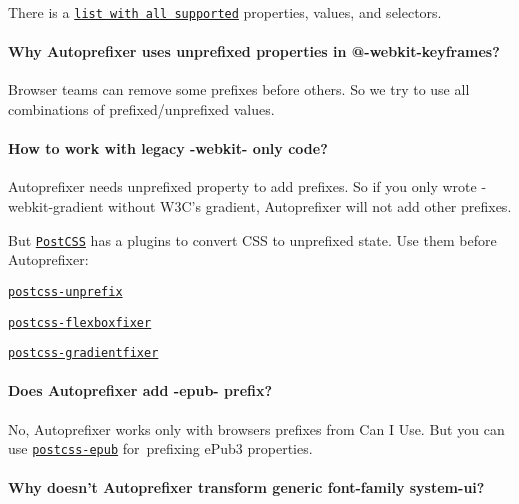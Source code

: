 There is a \href{https://github.com/postcss/autoprefixer/wiki/support-list}{\tt list with all supported} properties, values, and selectors.

\paragraph*{Why Autoprefixer uses unprefixed properties in {\ttfamily @-\/webkit-\/keyframes}?}

Browser teams can remove some prefixes before others. So we try to use all combinations of prefixed/unprefixed values.

\paragraph*{How to work with legacy {\ttfamily -\/webkit-\/} only code?}

Autoprefixer needs unprefixed property to add prefixes. So if you only wrote {\ttfamily -\/webkit-\/gradient} without W3\+C’s {\ttfamily gradient}, Autoprefixer will not add other prefixes.

But \href{https://github.com/postcss/postcss}{\tt Post\+C\+SS} has a plugins to convert C\+SS to unprefixed state. Use them before Autoprefixer\+:


\begin{DoxyItemize}
\item \href{https://github.com/yisibl/postcss-unprefix}{\tt postcss-\/unprefix}
\item \href{https://github.com/hallvors/postcss-flexboxfixer}{\tt postcss-\/flexboxfixer}
\item \href{https://github.com/hallvors/postcss-gradientfixer}{\tt postcss-\/gradientfixer}
\end{DoxyItemize}

\paragraph*{Does Autoprefixer add {\ttfamily -\/epub-\/} prefix?}

No, Autoprefixer works only with browsers prefixes from Can I Use. But you can use \href{https://github.com/Rycochet/postcss-epub}{\tt postcss-\/epub} for prefixing e\+Pub3 properties.

\paragraph*{Why doesn’t Autoprefixer transform generic font-\/family {\ttfamily system-\/ui}?}


